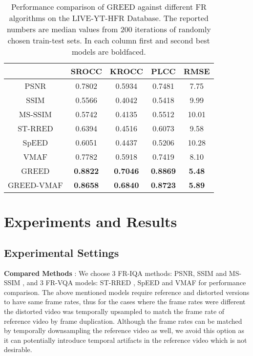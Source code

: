 \documentclass[conference]{IEEEtran}
\begin{document}
\begin{table}[t]
\caption{Performance comparison of GREED against different FR algorithms on the LIVE-YT-HFR Database. The reported numbers are median values from 200 iterations of randomly chosen train-test sets. In each column first and second best models are boldfaced.}
    \label{Table:MOS_comparison}
    \centering
    \begin{tabular}{|c||c|c|c|c|}
        \hline
        ~    & SROCC  & KROCC  & PLCC  & RMSE  \\ \hline \hline
        PSNR & 0.7802 & 0.5934 & 0.7481 & 7.75 \\ 
        SSIM \cite{wang2004image} & 0.5566 & 0.4042 & 0.5418 & 9.99 \\ 
        MS-SSIM \cite{wang2003multiscale} & 0.5742 & 0.4135 & 0.5512 & 10.01 \\
        ST-RRED \cite{soundararajan2012video} & 0.6394 & 0.4516 & 0.6073 & 9.58 \\ 
        SpEED \cite{bampis2017speed} & 0.6051 & 0.4437 & 0.5206 & 10.28 \\
        VMAF \cite{VMAF2016}& 0.7782 & 0.5918 & 0.7419 & 8.10 \\ \hline
        GREED & \textbf{0.8822} & \textbf{0.7046} & \textbf{0.8869} & \textbf{5.48} \\
        GREED-VMAF & \textbf{0.8658} & \textbf{0.6840} & \textbf{0.8723} & \textbf{5.89} \\
        \hline
    \end{tabular}
\end{table}

\section{Experiments and Results}
\label{sec:experiments}
\subsection{Experimental Settings}
\textbf{Compared Methods} : We choose 3 FR-IQA methods: PSNR, SSIM \cite{wang2004image} and MS-SSIM \cite{wang2003multiscale}, and 3 FR-VQA models: ST-RRED \cite{soundararajan2012video}, SpEED \cite{bampis2017speed} and VMAF \cite{VMAF2016} for performance comparison. The above mentioned models require reference and distorted versions to have same frame rates, thus for the cases where the frame rates were different the distorted video was temporally upsampled to match the frame rate of reference video by frame duplication. Although the frame rates can be matched by temporally downsampling the reference video as well, we avoid this option as it can potentially introduce temporal artifacts in the reference video which is not desirable.
\end{document}
